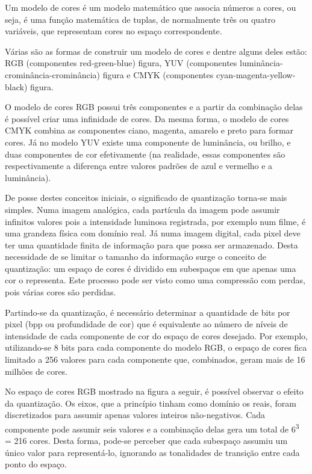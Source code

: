 Um modelo de cores é um modelo matemático que associa números a cores, ou seja, é uma função matemática de tuplas, de normalmente três ou quatro variáveis, que representam cores no espaço correspondente.

Várias são as formas de construir um modelo de cores e dentre alguns deles estão: RGB (componentes red-green-blue) figura, YUV (componentes luminância-crominância-crominância) figura e CMYK (componentes cyan-magenta-yellow-black) figura.


O modelo de cores RGB possui três componentes e a partir da combinação delas é possível criar uma infinidade de cores. Da mesma forma, o modelo de cores CMYK combina as componentes ciano, magenta, amarelo e preto para formar cores. Já no modelo YUV existe uma componente de luminância, ou brilho, e duas componentes de cor efetivamente (na realidade, essas componentes são respectivamente a diferença entre valores padrões de azul e vermelho e a luminância).

De posse destes conceitos iniciais, o significado de quantização torna-se mais simples. Numa imagem analógica, cada partícula da imagem pode assumir infinitos valores pois a intensidade luminosa registrada, por exemplo num filme, é uma grandeza física com domínio real. Já numa imagem digital, cada pixel deve ter uma quantidade finita de informação para que possa ser armazenado. Desta necessidade de se limitar o tamanho da informação surge o conceito de quantização: um espaço de cores é dividido em subespaços em que apenas uma cor o representa. Este processo pode ser visto como uma compressão com perdas, pois várias cores são perdidas.

Partindo-se da quantização, é necessário determinar a quantidade de bits por pixel (bpp ou profundidade de cor) que é equivalente ao número de níveis de intensidade de cada componente de cor do espaço de cores desejado. Por exemplo, utilizando-se 8 bits para cada componente do modelo RGB, o espaço de cores fica limitado a 256 valores para cada componente que, combinados, geram mais de 16 milhões de cores.

No espaço de cores RGB mostrado na figura a seguir, é possível observar o efeito da quantização. Os eixos, que a princípio tinham como domínio os reais, foram discretizados para assumir apenas valores inteiros não-negativos. Cada componente pode assumir seis valores e a combinação delas gera um total de 6\textsuperscript{3} = 216 cores. Desta forma, pode-se perceber que cada subespaço assumiu um único valor para representá-lo, ignorando as tonalidades de transição entre cada ponto do espaço.

